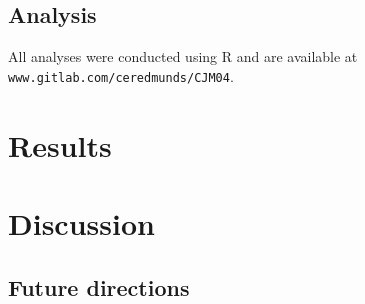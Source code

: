 \documentclass[12pt]{article}
\begin{document}


\subsection{Analysis} 
All analyses were conducted using R \cite{Rcite} and are available at
\texttt{www.gitlab.com/ceredmunds/CJM04}.


\section{Results}


\section{Discussion}

\subsection{Future directions}


\newpage


\end{document}
